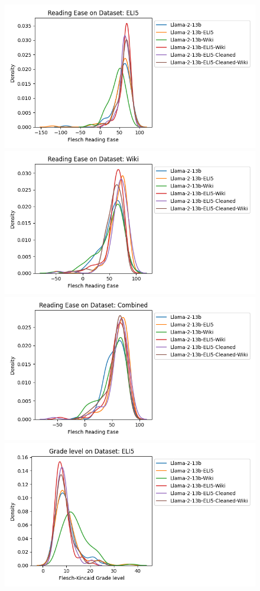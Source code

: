 \documentclass[11pt, oneside]{article}   	%
\begin{document}
\begin{figure}
\includegraphics[scale=.5]{./figures/FRE_13B_ELI5.png}
\includegraphics[scale=.5]{./figures/FRE_13B_Wiki.png}
\\
\includegraphics[scale=.5]{./figures/FRE_13B_full.png}
\includegraphics[scale=.5]{./figures/FKG_13B_ELI5.png}

\end{figure}
\end{document}
